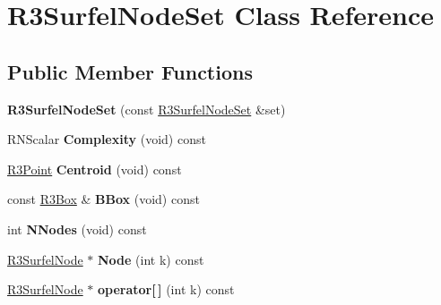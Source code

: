 \hypertarget{class_r3_surfel_node_set}{}\section{R3\+Surfel\+Node\+Set Class Reference}
\label{class_r3_surfel_node_set}
\subsection*{Public Member Functions}
\begin{DoxyCompactItemize}
\item 
{\bfseries R3\+Surfel\+Node\+Set} (const \hyperlink{class_r3_surfel_node_set}{R3\+Surfel\+Node\+Set} \&set)\hypertarget{class_r3_surfel_node_set_afb711333f22599a1c5c0660bb2b5835d}{}\label{class_r3_surfel_node_set_afb711333f22599a1c5c0660bb2b5835d}

\item 
R\+N\+Scalar {\bfseries Complexity} (void) const \hypertarget{class_r3_surfel_node_set_a9145746f0df33b6be01e9bf655a80e8e}{}\label{class_r3_surfel_node_set_a9145746f0df33b6be01e9bf655a80e8e}

\item 
\hyperlink{class_r3_point}{R3\+Point} {\bfseries Centroid} (void) const \hypertarget{class_r3_surfel_node_set_a490d1cd0ab7284606ac1cc789d5c8c69}{}\label{class_r3_surfel_node_set_a490d1cd0ab7284606ac1cc789d5c8c69}

\item 
const \hyperlink{class_r3_box}{R3\+Box} \& {\bfseries B\+Box} (void) const \hypertarget{class_r3_surfel_node_set_afc524c2f320b5ce8289339d1555b3d1a}{}\label{class_r3_surfel_node_set_afc524c2f320b5ce8289339d1555b3d1a}

\item 
int {\bfseries N\+Nodes} (void) const \hypertarget{class_r3_surfel_node_set_a012f5af3e2ad24d8b9d53b9a5af41237}{}\label{class_r3_surfel_node_set_a012f5af3e2ad24d8b9d53b9a5af41237}

\item 
\hyperlink{class_r3_surfel_node}{R3\+Surfel\+Node} $\ast$ {\bfseries Node} (int k) const \hypertarget{class_r3_surfel_node_set_a5ea82a054a06946729cfb768c807ceac}{}\label{class_r3_surfel_node_set_a5ea82a054a06946729cfb768c807ceac}

\item 
\hyperlink{class_r3_surfel_node}{R3\+Surfel\+Node} $\ast$ {\bfseries operator\mbox{[}$\,$\mbox{]}} (int k) const \hypertarget{class_r3_surfel_node_set_ac2ed674a07669e6045bd8c165ab90d3e}{}\label{class_r3_surfel_node_set_ac2ed674a07669e6045bd8c165ab90d3e}


\end{DoxyCompactItemize}
